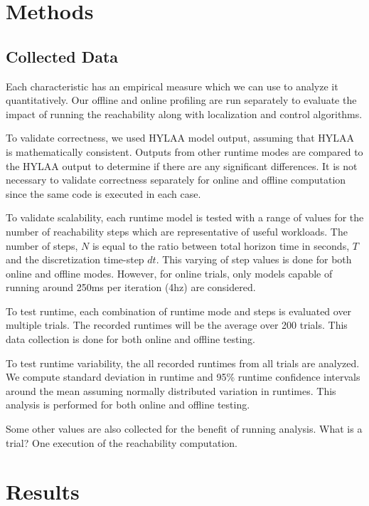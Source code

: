 \documentclass[runningheads]{llncs}
\begin{document}
\section{Methods}
\subsection{Collected Data}
Each characteristic has an empirical measure which we can use to analyze it quantitatively. Our offline and online profiling are run separately to evaluate the impact of running the reachability along with localization and control algorithms.

To validate correctness, we used HYLAA model output, assuming that HYLAA is mathematically consistent. Outputs from other runtime modes are compared to the HYLAA output to determine if there are any significant differences. It is not necessary to validate correctness separately for online and offline computation since the same code is executed in each case.

To validate scalability, each runtime model is tested with a range of values for the number of reachability steps which are representative of useful workloads. The number of steps, $N$ is equal to the ratio between total horizon time in seconds, $T$ and the discretization time-step $dt$. This varying of step values is done for both online and offline modes. However, for online trials, only models capable of running around 250ms per iteration (4hz) are considered.

To test runtime, each combination of runtime mode and steps is evaluated over multiple trials. The recorded runtimes will be the average over 200 trials. This data collection is done for both online and offline testing.

To test runtime variability, the all recorded runtimes from all trials are analyzed. We compute standard deviation in runtime and 95\% runtime confidence intervals around the mean assuming normally distributed variation in runtimes. This analysis is performed for both online and offline testing.

Some other values are also collected for the benefit of running analysis. 
What is a trial? One execution of the reachability computation.  


\section{Results}
\end{document}
